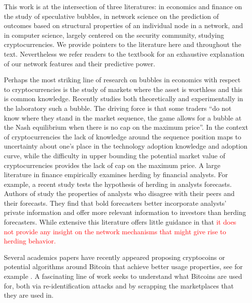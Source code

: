 This work is at the intersection of three literatures: in economics and finance on the study of speculative bubbles, in network science on the prediction of outcomes based on structural properties of an individual node in a network, and in computer science, largely centered on the security community, studying cryptocurrencies.
We provide pointers to the literature here and throughout the text. Nevertheless we refer readers to the textbook \cite{KleinbergNetworks} for an exhaustive explanation of our network features and their predictive power.

Perhaps the most striking line of research on bubbles in economics with respect to cryptocurrencies is the study of markets where the asset is worthless and this is common knowledge. 
Recently \cite{moinas2013bubble} studies both theoretically and experimentally in the laboratory such a bubble. 
The driving force is that some traders ``do not know where they stand in the market sequence, the game allows for
a bubble at the Nash equilibrium when there is no cap on the maximum price''.
In the context of cryptocurrencies the lack of knowledge around the sequence position maps to uncertainty about one's place in the technology adoption knowledge and adoption curve, while the difficulty in upper bounding the potential market value of cryptocurrencies provides the lack of cap on the maximum price. 
A large literature in finance empirically examines herding by financial analysts. For example, a recent study \cite{jegadeesh2009analysts} tests the hypothesis of herding in analysts forecasts. 
Authors of \cite{clement2005financial} study the properties of analysts who disagree with their peers and their forecasts. They find that bold forecasters better incorporate analysts' private information and offer more relevant information to investors than herding forecasters.
While extensive this literature offers little guidance in that \textcolor{red}{it does not provide any insight on the network mechanisms that might give rise to herding behavior.}

Several academics papers have recently appeared proposing cryptocoins or potential algorithms around Bitcoin that achieve better usage properties, see for example \cite{bonneau2014mixcoin}.
A fascinating line of work \cite{meiklejohn2013fistful, soska2015measuring} seeks to understand what Bitcoins are used for, both via re-identification attacks and by scrapping the marketplaces that they are used in.

